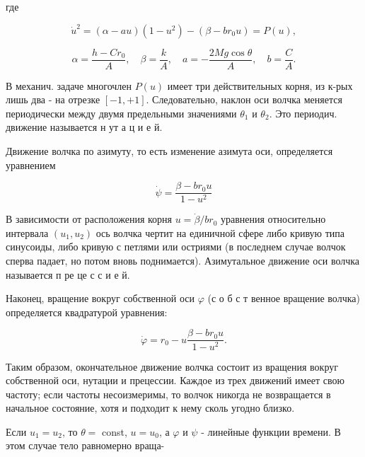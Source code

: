 \documentclass[10pt]{article}
\begin{document}
где



\[

\dot{u}^{2}=(\alpha-a u)\left(1-u^{2}\right)-\left(\beta-b r_{0} u\right)=P(u),

\]



\[

\alpha=\frac{h-C r_{0}}{A}, \quad \beta=\frac{k}{A}, \quad a=-\frac{2 M g \cos \theta}{A}, \quad b=\frac{C}{A} .

\]



В механич. задаче многочлен $P(u)$ имеет три действительных корня, из к-рых лишь два - на отрезке $[-1,+1]$. Следовательно, наклон оси волчка меняется периодически между двумя предельными значениями $\theta_{1}$ и $\theta_{2}$. Это периодич. движение называется н ут а ц и е й.



Движение волчка по азимуту, то есть изменение азимута оси, определяется уравнением



\[

\dot{\psi}=\frac{\beta-b r_{0} u}{1-u^{2}}

\]



В зависимости от расположения корня $u=\dot{\beta} / b r_{0}$ уравнения относительно интервала $\left(u_{1}, u_{2}\right)$ ось волчка чертит на единичной сфере либо кривую типа синусоиды, либо кривую с петлями или остриями (в последнем случае волчок сперва падает, но потом вновь поднимается). Азимутальное движение оси волчка называется п ре це с с и е й.



Наконец, вращение вокруг собственной оси $\varphi$ (с о б с т венное вращение волчка) определяется квадратурой уравнения:



\[

\dot{\varphi}=r_{0}-u \frac{\beta-b r_{0} u}{1-u^{2}} .

\]



Таким образом, окончательное движение волчка состоит из вращения вокруг собственной оси, нутации и прецессии. Каждое из трех движений имеет свою частоту; если частоты несоизмеримы, то волчок никогда не возвращается в начальное состояние, хотя и подходит к нему сколь угодно близко.



Если $u_{1}=u_{2}$, то $\theta=$ const, $u=u_{0}$, а $\varphi$ и $\psi$ - линейные функции времени. В этом случае тело равномерно враща-
\end{document}
